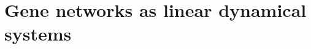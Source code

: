 \documentclass{article}
\newcommand{\jss}[1]{{\color{olive}\it #1}}
\newcommand{\1}{\mathbbm{1}}
\begin{document}
\section*{Gene networks as linear dynamical systems}
%
%
%
%
\end{document}
